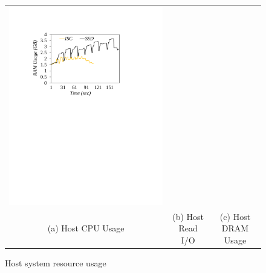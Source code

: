 \begin{figure}[t]
\begin{tabular}{ccc}
  \includegraphics[width=0.66\columnwidth]{figures/Hadoop_RAM_usage.pdf}\\	
  (a) Host CPU Usage & (b) Host Read I/O & (c) Host DRAM Usage
\end{tabular}
  \caption{Host system resource usage}
  \label{fig:host_resource_usage}
\end{figure}


